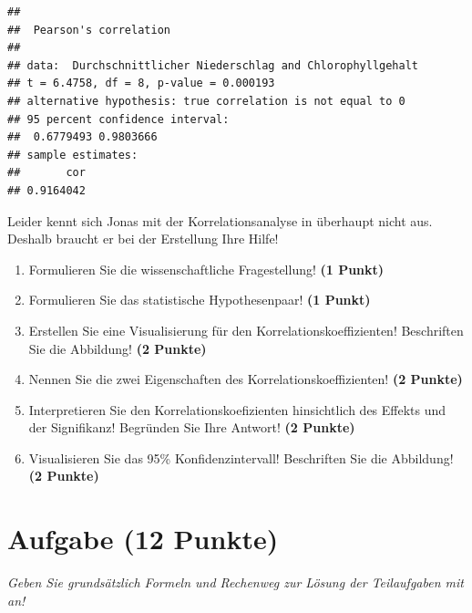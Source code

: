 \documentclass[a4paper, 9pt]{scrartcl}\usepackage[]{graphicx}\usepackage[]{xcolor}
\makeatletter
\newenvironment{kframe}{%
 \def\at@end@of@kframe{}%
 \ifinner\ifhmode%
  \def\at@end@of@kframe{\end{minipage}}%
  \begin{minipage}{\columnwidth}%
 \fi\fi%
 \def\FrameCommand##1{\hskip\@totalleftmargin \hskip-\fboxsep
 \colorbox{shadecolor}{##1}\hskip-\fboxsep
     \hskip-\linewidth \hskip-\@totalleftmargin \hskip\columnwidth}%
 \MakeFramed {\advance\hsize-\width
   \@totalleftmargin\z@ \linewidth\hsize
   \@setminipage}}%
 {\par\unskip\endMakeFramed%
 \at@end@of@kframe}
\newenvironment{knitrout}{}{} %
\makeatother
\begin{document}
\begin{knitrout}
\color{fgcolor}\begin{kframe}
\begin{verbatim}
## 
## 	Pearson's correlation
## 
## data:  Durchschnittlicher Niederschlag and Chlorophyllgehalt
## t = 6.4758, df = 8, p-value = 0.000193
## alternative hypothesis: true correlation is not equal to 0
## 95 percent confidence interval:
##  0.6779493 0.9803666
## sample estimates:
##       cor 
## 0.9164042
\end{verbatim}
\end{kframe}
\end{knitrout}

Leider kennt sich Jonas mit der Korrelationsanalyse in \Rlogo überhaupt nicht aus. Deshalb braucht er bei der Erstellung Ihre Hilfe!

\begin{enumerate}
  \item Formulieren Sie die wissenschaftliche Fragestellung! \textbf{(1 Punkt)}
  \item Formulieren Sie das statistische Hypothesenpaar! \textbf{(1 Punkt)}
\item Erstellen Sie eine Visualisierung für den Korrelationskoeffizienten! Beschriften Sie die Abbildung! \textbf{(2 Punkte)}
\item Nennen Sie die zwei Eigenschaften des Korrelationskoeffizienten! \textbf{(2 Punkte)}
\item Interpretieren Sie den Korrelationskoefizienten hinsichtlich des
  Effekts und der Signifikanz! Begründen Sie Ihre Antwort! \textbf{(2 Punkte)}
\item Visualisieren Sie das 95\% Konfidenzintervall! Beschriften Sie die Abbildung! \textbf{(2 Punkte)} 
\end{enumerate} 
\clearpage

\section{Aufgabe \hfill (12 Punkte)}

\textit{Geben Sie grundsätzlich Formeln und Rechenweg zur Lösung der Teilaufgaben mit an!} \\[1Ex]
 
\end{document}
